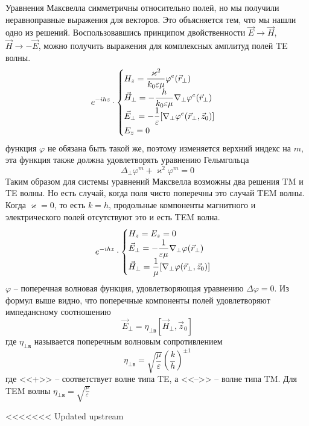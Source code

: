 \documentclass[a4paper,14pt]{extarticle}
\renewcommand{\phi}{\varphi}
\renewcommand{\epsilon}{\varepsilon}
\renewcommand{\kappa}{\varkappa}
\newcommand{\ticket}[1] {
\newpage
\hypertarget{num#1}{}
\begin{center}
	\textbf{Вопрос минимума №#1 }
\end{center}
}
\begin{document}
	Уравнения Максвелла симметричны относительно полей, но мы получили неравноправные выражения для векторов. Это объясняется тем, что мы нашли одно из решений. Воспользовавшись принципом двойственности $\vec{E}\to\vec{H}$, $\vec{H}\to -\vec{E}$, можно получить выражения  для комплексных амплитуд полей TE волны. 
	\begin{displaymath}
	e^{-ihz}\cdot
	\begin{cases}
	$$\displaystyle H_z = \frac{\kappa^2}{k_0\epsilon\mu}\phi^e(\vec{r}_\perp)$$ \\
	$$\displaystyle\vec{H}_\perp = -\frac{h}{k_0\epsilon\mu}\nabla_\perp\phi^e(\vec{r}_\perp)$$ \\
	$$\displaystyle\vec{E}_\perp = -\frac{1}{\epsilon}[\nabla_\perp\phi^e(\vec{r}_\perp,\vec{z}_0)]$$ \\
	$$\displaystyle E_z = 0$$
	\end{cases}
	\end{displaymath}
	функция $\phi$ не обязана быть такой же, поэтому изменяется верхний индекс на $m$, эта функция также должна удовлетворять уравнению Гельмгольца  
	$$\Delta_\perp\phi^{m} + \kappa^2\phi^{m}=0$$
	Таким образом для системы уравнений Максвелла возможны два решения TM и TE волны. Но есть случай, когда поля чисто поперечны это случай TEM волны.
	Когда $\kappa = 0$, то есть $k=h$, продольные компоненты магнитного и электрического полей отсутствуют это и есть TEM волна.
	\begin{displaymath}
	e^{-ihz}\cdot
	\begin{cases}
	$$\displaystyle H_z = E_z = 0$$ \\
	$$\displaystyle\vec{E}_\perp = -\frac{1}{\epsilon\mu}\nabla_\perp\phi(\vec{r}_\perp)$$ \\
	$$\displaystyle\vec{H}_\perp = \frac{1}{\mu}[\nabla_\perp\phi(\vec{r}_\perp,\vec{z}_0)]$$ 
	\end{cases}
	\end{displaymath}
	$\phi$ -- поперечная волновая функция, удовлетворяющая уравнению $\Delta\phi=0$.
	Из формул выше видно, что поперечные компоненты полей удовлетворяют импедансному соотношению
	$$\vec{E}_\perp = \eta_{\perp\text{в}}[\vec{H}_\perp,\vec{z}_0]$$
	где $\eta_{\perp\text{в}}$ называется поперечным волновым сопротивлением
	$$\eta_{\perp\text{в}}=\sqrt{\frac{\mu}{\epsilon}} \left( \frac{k}{h} \right)^{\pm 1}$$ 
	где <<+>> -- соответствует волне типа TE, а <<-->> -- волне типа TM. Для TEM волны $\displaystyle \eta_{\perp\text{в}}=\sqrt{\frac{\mu}{\epsilon}}$
	
<<<<<<< Updated upstream
	
\end{document}
